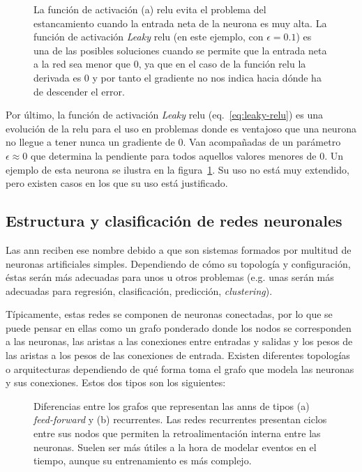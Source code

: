 \begin{figure}[t]
	\centering
	\qquad
	\caption[Funciones de activación: \acrshort{relu} y Leaky-\acrshort{relu}.]{La función de activación (a) \gls{relu} evita el problema del estancamiento cuando la entrada neta de la neurona es muy alta. La función de activación \textit{Leaky} \gls{relu} (en este ejemplo, con $\epsilon = 0.1$) es una de las posibles soluciones cuando se permite que la entrada neta a la red sea menor que 0, ya que en el caso de la función \gls{relu} la derivada es 0 y por tanto el gradiente no nos indica hacia dónde ha de descender el error.}
	\label{fig:relu-and-leaky-relu}
\end{figure}

Por último, la función de activación \textit{Leaky} \gls{relu} (eq.~\ref{eq:leaky-relu}) es una evolución de la \gls{relu} para el uso en problemas donde es ventajoso que una neurona no llegue a tener nunca un gradiente de 0. Van acompañadas de un parámetro $\epsilon \approx 0$ que determina la pendiente para todos aquellos valores menores de $0$. Un ejemplo de esta neurona se ilustra en la figura~\ref{fig:relu-and-leaky-relu}. Su uso no está muy extendido, pero existen casos en los que su uso está justificado.

\subsection{Estructura y clasificación de redes neuronales}

Las \gls{ann} reciben ese nombre debido a que son sistemas formados por multitud de neuronas artificiales simples. Dependiendo de cómo su topología y configuración, éstas serán más adecuadas para unos u otros problemas (e.g. unas serán más adecuadas para regresión, clasificación, predicción, \textit{clustering}).

Típicamente, estas redes se componen de neuronas conectadas, por lo que se puede pensar en ellas como un grafo ponderado donde los nodos se corresponden a las neuronas, las aristas a las conexiones entre entradas y salidas y los pesos de las aristas a los pesos de las conexiones de entrada. Existen diferentes topologías o arquitecturas dependiendo de qué forma toma el grafo que modela las neuronas y sus conexiones. Estos dos tipos son los siguientes:

\begin{figure}[t]
	\centering
	\qquad
	\caption[Diferencias entre toppologías de redes \textit{feed-forward} y \textit{recurrentes}]{Diferencias entre los grafos que representan las \acp{ann} de tipos (a) \textit{feed-forward} y (b) recurrentes. Las redes recurrentes presentan ciclos entre sus nodos que permiten la retroalimentación interna entre las neuronas. Suelen ser más útiles a la hora de modelar eventos en el tiempo, aunque su entrenamiento es más complejo.}
	\label{fig:ff-vs-rnn}
\end{figure}

